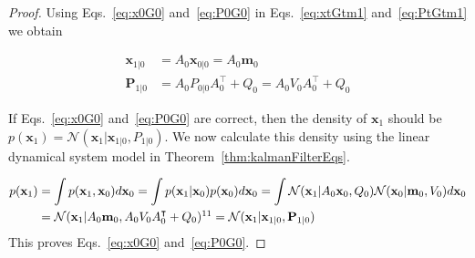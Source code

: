 \documentclass[12pt]{article}
\begin{document}
\begin{proof}
	Using Eqs.~\ref{eq:x0G0} and~\ref{eq:P0G0} in Eqs.~\ref{eq:xtGtm1} and~\ref{eq:PtGtm1} we obtain

    \begin{align*}
        \mathbf{x}_{1|0}&=A_0\mathbf{x}_{0|0}=A_0\mathbf{m}_0\\
        \mathbf{P}_{1|0}&=A_0P_{0|0}A_0^\intercal+Q_0=A_0V_0A_0^\intercal+Q_0
    \end{align*}

	If Eqs.~\ref{eq:x0G0} and~\ref{eq:P0G0} are correct, then the density of $\mathbf{x}_1$ should be $p(\mathbf{x}_1)=\mathcal{N}(\mathbf{x}_1|\mathbf{x}_{1|0},P_{1|0})$. We now calculate this density using the linear dynamical system model in Theorem~\ref{thm:kalmanFilterEqs}.

    \begin{align}
		p(\mathbf{x}_1)&=\int p(\mathbf{x}_1,\mathbf{x}_0)d\mathbf{x}_0=\int p(\mathbf{x}_1|\mathbf{x}_0)p(\mathbf{x}_0)d\mathbf{x}_0=\int\mathcal{N}(\mathbf{x}_1|A_0\mathbf{x}_0,Q_0)\mathcal{N}(\mathbf{x}_0|\mathbf{m}_0,V_0)d\mathbf{x}_0\nonumber\\
                       &=\mathcal{N}(\mathbf{x}_1|A_0\mathbf{m}_0,A_0V_0A_0^\intercal+Q_0)\footnotemark[11]=\mathcal{N}(\mathbf{x}_1|\mathbf{x}_{1|0},\mathbf{P}_{1|0})\nonumber
    \end{align}
	This proves Eqs.~\ref{eq:x0G0} and~\ref{eq:P0G0}.

\end{proof}

\pagebreak



\pagebreak



\pagebreak





\end{document}
